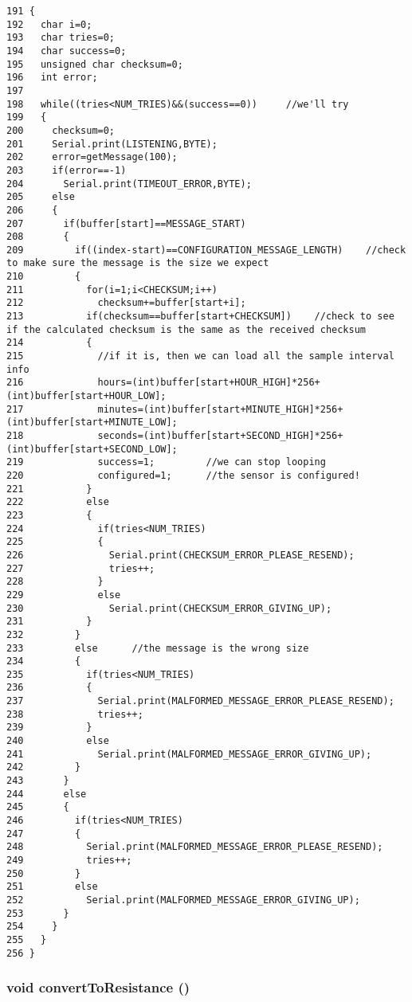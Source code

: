\begin{Code}\begin{verbatim}191 { 
192   char i=0;
193   char tries=0;
194   char success=0;
195   unsigned char checksum=0;
196   int error;
197 
198   while((tries<NUM_TRIES)&&(success==0))     //we'll try
199   {
200     checksum=0;
201     Serial.print(LISTENING,BYTE);
202     error=getMessage(100);
203     if(error==-1)
204       Serial.print(TIMEOUT_ERROR,BYTE);
205     else
206     {
207       if(buffer[start]==MESSAGE_START)
208       {
209         if((index-start)==CONFIGURATION_MESSAGE_LENGTH)    //check to make sure the message is the size we expect
210         {
211           for(i=1;i<CHECKSUM;i++)
212             checksum+=buffer[start+i];
213           if(checksum==buffer[start+CHECKSUM])    //check to see if the calculated checksum is the same as the received checksum
214           {
215             //if it is, then we can load all the sample interval info
216             hours=(int)buffer[start+HOUR_HIGH]*256+(int)buffer[start+HOUR_LOW];
217             minutes=(int)buffer[start+MINUTE_HIGH]*256+(int)buffer[start+MINUTE_LOW];
218             seconds=(int)buffer[start+SECOND_HIGH]*256+(int)buffer[start+SECOND_LOW];
219             success=1;         //we can stop looping
220             configured=1;      //the sensor is configured!
221           }
222           else
223           {
224             if(tries<NUM_TRIES)
225             {
226               Serial.print(CHECKSUM_ERROR_PLEASE_RESEND);
227               tries++;
228             }
229             else
230               Serial.print(CHECKSUM_ERROR_GIVING_UP);
231           }
232         }
233         else      //the message is the wrong size
234         {
235           if(tries<NUM_TRIES)
236           {
237             Serial.print(MALFORMED_MESSAGE_ERROR_PLEASE_RESEND);
238             tries++;
239           }
240           else
241             Serial.print(MALFORMED_MESSAGE_ERROR_GIVING_UP);
242         }
243       }
244       else
245       {
246         if(tries<NUM_TRIES)
247         {
248           Serial.print(MALFORMED_MESSAGE_ERROR_PLEASE_RESEND);
249           tries++;
250         }
251         else
252           Serial.print(MALFORMED_MESSAGE_ERROR_GIVING_UP);
253       }
254     }
255   }
256 }
\end{verbatim}
\end{Code}


\hypertarget{applet_2temperature__sensor___terciopelo_8pde_8e666a34a083b1806167ca991be0c436}{
\subsubsection[{convertToResistance}]{\setlength{\rightskip}{0pt plus 5cm}void convertToResistance ()}}
\label{applet_2temperature__sensor___terciopelo_8pde_8e666a34a083b1806167ca991be0c436}


